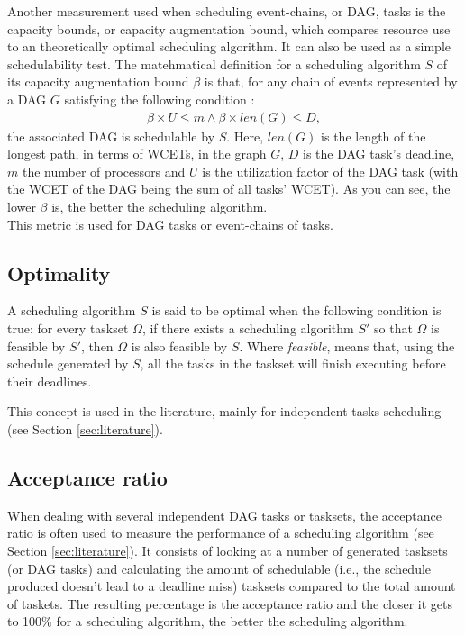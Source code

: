 Another measurement used when scheduling event-chains, or DAG, tasks  
is the capacity bounds, or capacity augmentation bound,
which compares resource use to an theoretically optimal scheduling algorithm.
It can also be used as a simple schedulability test.
The matehmatical definition for a scheduling algorithm $S$ of its capacity
augmentation bound $\beta$ is that, for any chain of events represented by a DAG $G$
satisfying the following condition :
\begin{align}
    \beta \times U \leq m \wedge  \beta \times len(G) \leq D,
\end{align}
the associated DAG is schedulable by $S$.
Here, $len(G)$ is the length of the longest path, in terms of WCETs,
in the graph $G$, $D$ is the DAG task's deadline, $m$ the number of processors and $U$
is the utilization factor of the DAG task (with the WCET of the DAG being the sum of all tasks' WCET).
As you can see, the lower $\beta$ is, the better the scheduling algorithm.\\
This metric is used for DAG tasks or event-chains of tasks.

\subsection{Optimality}

A scheduling algorithm $S$ is said to be optimal 
when the following condition is true:
for every taskset $\Omega$, if there exists 
a scheduling algorithm $S'$ so that $\Omega$ is feasible by $S'$,
then $\Omega$ is also feasible by $S$.
Where {\it{feasible}}, 
means that, using the schedule generated by $S$,
all the tasks in the taskset will finish executing before their deadlines.

This concept is used in the literature, mainly for independent tasks scheduling
(see Section \ref{sec:literature}).

\subsection{Acceptance ratio}

When dealing with several independent DAG tasks
or tasksets, 
the acceptance ratio is often used to measure the 
performance of a scheduling algorithm (see Section \ref{sec:literature}).
It consists of looking at a number of generated tasksets (or DAG tasks)
and calculating the amount of schedulable (i.e., 
the schedule produced doesn't lead to a deadline miss) tasksets compared to 
the total amount of taskets.
The resulting percentage is the acceptance ratio 
and the closer it gets to 100\% for a scheduling algorithm, the better the scheduling algorithm.

